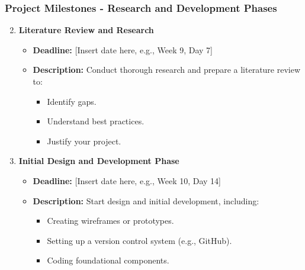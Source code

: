 \documentclass[aspectratio=169]{beamer}
\begin{document}
\begin{frame}[fragile]
    \frametitle{Project Milestones - Research and Development Phases}
    \begin{enumerate}
        \setcounter{enumi}{1}
        \item \textbf{Literature Review and Research}
        \begin{itemize}
            \item \textbf{Deadline:} [Insert date here, e.g., Week 9, Day 7]
            \item \textbf{Description:} Conduct thorough research and prepare a literature review to:
            \begin{itemize}
                \item Identify gaps.
                \item Understand best practices.
                \item Justify your project.
            \end{itemize}
        \end{itemize}

        \item \textbf{Initial Design and Development Phase}
        \begin{itemize}
            \item \textbf{Deadline:} [Insert date here, e.g., Week 10, Day 14]
            \item \textbf{Description:} Start design and initial development, including:
            \begin{itemize}
                \item Creating wireframes or prototypes.
                \item Setting up a version control system (e.g., GitHub).
                \item Coding foundational components.
            \end{itemize}
        \end{itemize}
    \end{enumerate}
\end{frame}
\end{document}
